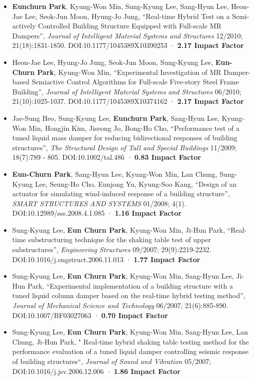 \documentclass[]{article}
\providecommand{\tightlist}{%
  \setlength{\itemsep}{0pt}\setlength{\parskip}{0pt}}
\begin{document}
\begin{itemize}
\tightlist
\item
  \textbf{Eunchurn Park}, Kyung-Won Min, Sung-Kyung Lee, Sang-Hyun Lee,
  Heon-Jae Lee, Seok-Jun Moon, Hyung-Jo Jung, ``Real-time Hybrid Test on
  a Semi-actively Controlled Building Structure Equipped with Full-scale
  MR Dampers'', \emph{Journal of Intelligent Material Systems and
  Structures} 12/2010; 21(18):1831-1850. DOI:10.1177/1045389X10390253 ·
  \textbf{2.17 Impact Factor}
\item
  Heon-Jae Lee, Hyung-Jo Jung, Seok-Jun Moon, Sung-Kyung Lee,
  \textbf{Eun-Churn Park}, Kyung-Won Min, ``Experimental Investigation
  of MR Damper-based Semiactive Control Algorithms for Full-scale
  Five-story Steel Frame Building'', \emph{Journal of Intelligent
  Material Systems and Structures} 06/2010; 21(10):1025-1037.
  DOI:10.1177/1045389X10374162 · \textbf{2.17 Impact Factor}
\item
  Jae-Sung Heo, Sung-Kyung Lee, \textbf{Eunchurn Park}, Sang-Hyun Lee,
  Kyung-Won Min, Hongjin Kim, Jiseong Jo, Bong-Ho Cho, ``Performance
  test of a tuned liquid mass damper for reducing bidirectional
  responses of building structures'', \emph{The Structural Design of
  Tall and Special Buildings} 11/2009; 18(7):789 - 805.
  DOI:10.1002/tal.486 · \textbf{0.83 Impact Factor}
\item
  \textbf{Eun-Churn Park}, Sang-Hyun Lee, Kyung-Won Min, Lan Chung,
  Sung-Kyung Lee, Seung-Ho Cho, Eunjong Yu, Kyung-Soo Kang, ``Design of
  an actuator for simulating wind-induced response of a building
  structure'', \emph{SMART STRUCTURES AND SYSTEMS} 01/2008; 4(1).
  DOI:10.12989/sss.2008.4.1.085 · \textbf{1.16 Impact Factor}
\item
  Sung-Kyung Lee, \textbf{Eun Churn Park}, Kyung-Won Min, Ji-Hun Park,
  ``Real-time substructuring technique for the shaking table test of
  upper substructures'', \emph{Engineering Structures} 09/2007;
  29(9):2219-2232. DOI:10.1016/j.engstruct.2006.11.013 · \textbf{1.77
  Impact Factor}
\item
  Sung-Kyung Lee, \textbf{Eun Churn Park}, Kyung-Won Min, Sang-Hyun Lee,
  Ji-Hun Park, ``Experimental implementation of a building structure
  with a tuned liquid column damper based on the real-time hybrid
  testing method'', \emph{Journal of Mechanical Science and Technology}
  06/2007; 21(6):885-890. DOI:10.1007/BF03027063 · \textbf{0.70 Impact
  Factor}
\item
  Sung-Kyung Lee, \textbf{Eun Churn Park}, Kyung-Won Min, Sang-Hyun Lee,
  Lan Chung, Ji-Hun Park, " Real-time hybrid shaking table testing
  method for the performance evaluation of a tuned liquid damper
  controlling seismic response of building structures``, \emph{Journal
  of Sound and Vibration} 05/2007; DOI:10.1016/j.jsv.2006.12.006 ·
  \textbf{1.86 Impact Factor}
\end{itemize}
\end{document}
